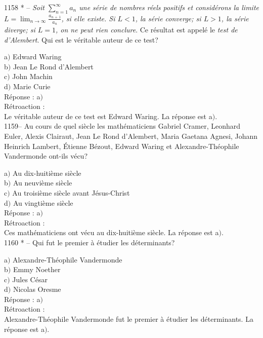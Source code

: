 ﻿\documentclass[letterpaper, 12pt]{article}
\begin{document}
1158 * -- {\sl Soit $\sum_{n=1}^{\infty}a_n$ une s\'erie de nombres
r\'eels positifs et consid\'erons la limite
$L=\lim_{n\to\infty}\frac{a_{n\,+\,1}}{a_n}$, si elle existe. Si
$L<1$, la s\'erie converge; si $L>1$, la s\'erie diverge; si $L=1$,
on ne peut rien conclure}. Ce r\'esultat est appel\'e le {\sl test
de d'Alembert}. Qui est le v\'eritable auteur de ce test?

a$)$ Edward Waring \\
b$)$ Jean Le Rond d'Alembert \\
c$)$ John Machin \\
d$)$ Marie Curie\\

R\'eponse : a$)$\\

R\'etroaction : \\
Le v\'eritable auteur de ce test est Edward Waring. La r\'eponse est a$)$.\\

1159-- Au cours de quel si\`ecle les math\'ematiciens Gabriel
Cramer, Leonhard Euler, Alexis Clairaut, Jean Le Rond d'Alembert,
Maria Gaetana Agnesi, Johann Heinrich Lambert, \'Etienne B\'ezout,
Edward Waring et Alexandre-Th\'eophile Vandermonde ont-ils v\'ecu?

a$)$ Au dix-huiti\`eme si\`ecle \\
b$)$ Au neuvi\`eme si\`ecle \\
c$)$ Au troisi\`eme si\`ecle avant J\'esus-Christ \\
d$)$ Au vingti\`eme si\`ecle   \\

R\'eponse : a$)$\\

R\'etroaction : \\
Ces math\'ematiciens ont v\'ecu au dix-huiti\`eme si\`ecle. La r\'eponse est
a$)$.\\

1160 * -- Qui fut le premier \`a \'etudier les d\'eterminants?

a$)$ Alexandre-Th\'eophile Vandermonde \\
b$)$ Emmy Noether \\
c$)$ Jules C\'esar \\
d$)$ Nicolas Oresme   \\

R\'eponse : a$)$\\

R\'etroaction : \\
Alexandre-Th\'eophile Vandermonde fut le premier \`a \'etudier les
d\'eterminants. La r\'eponse est a$)$.\\
\end{document}
